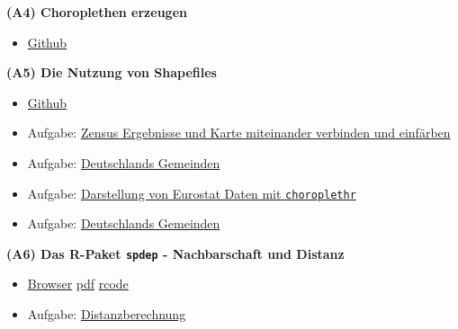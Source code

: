 \documentclass[ignorenonframetext,]{beamer}
\providecommand{\tightlist}{%
  \setlength{\itemsep}{0pt}\setlength{\parskip}{0pt}}
\begin{document}
\begin{frame}{\textbf{(A4) Choroplethen erzeugen}}
\protect\hypertarget{a4-choroplethen-erzeugen}{}

\begin{itemize}
\tightlist
\item
  \href{slides/Choroplethen.md}{Github}
\end{itemize}

\end{frame}

\begin{frame}[fragile]{\textbf{(A5) Die Nutzung von Shapefiles}}
\protect\hypertarget{a5-die-nutzung-von-shapefiles}{}

\begin{itemize}
\item
  \href{slides/Shapefiles.md}{Github}
\item
  Aufgabe:
  \href{https://github.com/Japhilko/GeoData/blob/master/2017/tutorial/Aufgabe_Verbindung.Rmd}{Zensus
  Ergebnisse und Karte miteinander verbinden und einfärben}
\item
  Aufgabe:
  \href{https://github.com/Japhilko/GeoData/blob/master/2016/tutorial/Aufgabe_Zensus_Ergebnisse.md}{Deutschlands
  Gemeinden}
\item
  Aufgabe:
  \href{https://github.com/Japhilko/GeoData/blob/master/2016/tutorial/Aufgabe_choroplethr.Rmd}{Darstellung
  von Eurostat Daten mit \texttt{choroplethr}}
\item
  Aufgabe:
  \href{https://github.com/Japhilko/GeoData/blob/master/2016/tutorial/Aufgabe_Zensus_Ergebnisse.md}{Deutschlands
  Gemeinden}
\end{itemize}

\end{frame}

\begin{frame}{\textbf{(A6) Das R-Paket \texttt{spdep} - Nachbarschaft
und Distanz}}
\protect\hypertarget{a6-das-r-paket-spdep---nachbarschaft-und-distanz}{}

\begin{itemize}
\tightlist
\item
  \href{slides/spdep.md}{Browser} \textbar{}
  \href{slides/spdep.pdf}{pdf} \textbar{}
  \href{https://raw.githubusercontent.com/Japhilko/GeoData/master/2016/rcode/slidesH1_spdep.R}{rcode}
\item
  Aufgabe:
  \href{https://github.com/Japhilko/GeoData/blob/master/2016/tutorial/Aufgabe_Distanzberechnung.Rmd}{Distanzberechnung}
\end{itemize}

\end{frame}
\end{document}
